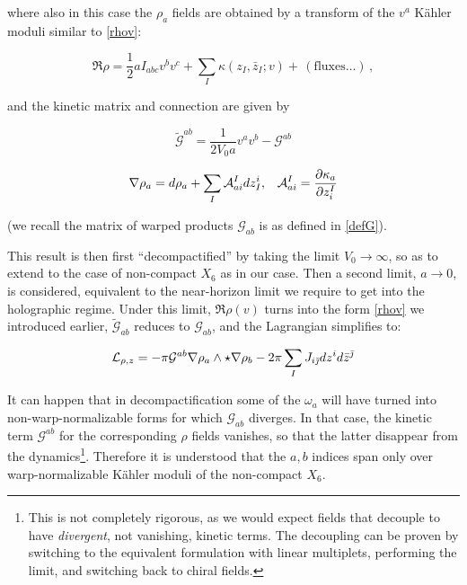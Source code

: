 where also in this case the $\rho_a$ fields are obtained by a transform of the $v^a$ K\"ahler moduli similar to \eqref{rhov}:

\begin{equation}
	\Re \rho  = \frac{1}{2} a I_{abc} v^b v^c + \sum_I \kappa(z_I,\bar z_I; v) + \, (\text{fluxes}\ldots) \,,
	\label{}
\end{equation}

and the kinetic matrix and connection are given by

\begin{equation}
	\tilde{\mathcal{G}}^{ab} = \frac{1}{2V_0 a} v^a v^b - \mathcal{G}^{ab}
	\label{}
\end{equation}

\begin{align}
	\nabla \rho_a = d\rho_a + \sum_I \mathcal{A}^I_{ai} dz_I^i, && \mathcal{A}^I_{ai} = \frac{\partial\kappa_a}{\partial z^I_i}
	\label{}
\end{align}

(we recall the matrix of warped products $\mathcal{G}_{ab}$ is as defined in \ref{defG}).

This result is then first ``decompactified'' by taking the limit $V_0 \rightarrow \infty$, so as to extend to the case of non-compact $X_6$ as in our case. Then a second limit, $a \rightarrow 0$, is considered, equivalent to the near-horizon limit we require to get into the holographic regime. Under this limit, $\Re \rho(v)$ turns into the form \ref{rhov} we introduced earlier, $\tilde{\mathcal{G}}_{ab}$ reduces to $\mathcal{G}_{ab}$, and the Lagrangian simplifies to:

\begin{equation}
	\mathcal{L}_{\rho,z} = - \pi \mathcal{G}^{ab} \nabla \rho_a \wedge \star \nabla \rho_b - 2\pi \sum_I J_{i\bar{\jmath}} dz^i d\bar z^{\bar\jmath}
	\label{}
\end{equation}

It can happen that in decompactification some of the $\omega_a$ will have turned into non-warp-normalizable forms for which $\mathcal{G}_{ab}$ diverges. In that case, the kinetic term $\mathcal{G}^{ab}$ for the corresponding $\rho$ fields vanishes, so that the latter disappear from the dynamics\footnote{This is not completely rigorous, as we would expect fields that decouple to have \emph{divergent}, not vanishing, kinetic terms. The decoupling can be proven\cite{MZ} by switching to the equivalent formulation with linear multiplets, performing the limit, and switching back to chiral fields.}. Therefore it is understood that the $a,b$ indices span only over warp-normalizable K\"ahler moduli of the non-compact $X_6$.

